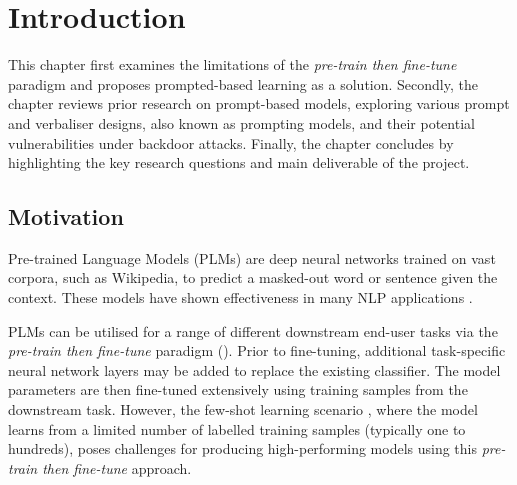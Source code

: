\chapter{Introduction}
\vspace{-0.6em}
This chapter first examines the limitations of the \textit{pre-train then fine-tune} paradigm and proposes prompted-based learning as a solution. Secondly, the chapter reviews prior research on prompt-based models, exploring various prompt and verbaliser designs, also known as prompting models, and their potential vulnerabilities under backdoor attacks. Finally, the chapter concludes by highlighting the key research questions and main deliverable of the project.

\vspace{-0.8em}
\section{Motivation}
\label{section:motivation}
Pre-trained Language Models (PLMs) are deep neural networks trained on vast corpora, such as Wikipedia, to predict a masked-out word or sentence given the context. These models have shown effectiveness in many NLP applications \cite{Devlin18BERT}. 

PLMs can be utilised for a range of different downstream end-user tasks via the \textit{pre-train then fine-tune} paradigm (). Prior to fine-tuning, additional task-specific neural network layers may be added to replace the existing classifier. The model parameters are then fine-tuned extensively using training samples from the downstream task. However, the few-shot learning scenario \cite{FeiFei06Oneshot}, where the model learns from a limited number of labelled training samples (typically one to hundreds), poses challenges for producing high-performing models using this \emph{pre-train then fine-tune} approach.

